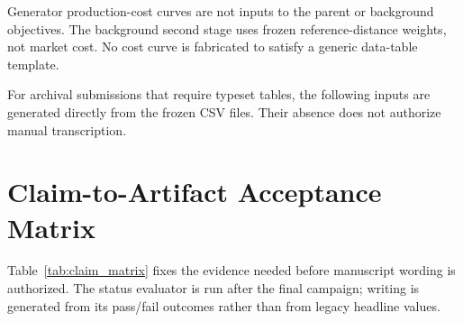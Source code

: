 \documentclass[10pt,journal,onecolumn]{IEEEtran}
\begin{document}
Generator production-cost curves are not inputs to the parent or background
objectives. The background second stage uses frozen reference-distance weights,
not market cost. No cost curve is fabricated to satisfy a generic data-table
template.

For archival submissions that require typeset tables, the following inputs are
generated directly from the frozen CSV files. Their absence does not authorize
manual transcription.

\section{Claim-to-Artifact Acceptance Matrix}
\label{sec:report_claims}

Table~\ref{tab:claim_matrix} fixes the evidence needed before manuscript
wording is authorized. The status evaluator is run after the final campaign;
writing is generated from its pass/fail outcomes rather than from legacy
headline values.
\end{document}
